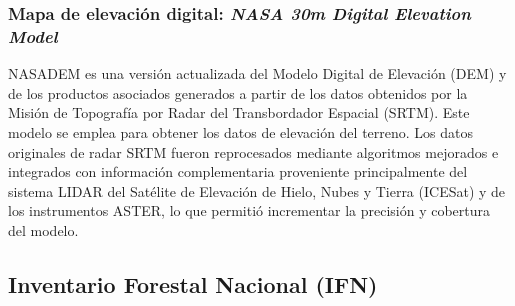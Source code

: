 \subsubsection*{Mapa de elevación digital: \textit{NASA 30m Digital Elevation Model}}

NASADEM \cite{nasadem_data} es una versión actualizada del Modelo Digital de Elevación (DEM) y de los productos asociados generados a partir de los datos obtenidos por la Misión de Topografía por Radar del Transbordador Espacial (SRTM). Este modelo se emplea para obtener los datos de elevación del terreno. Los datos originales de radar SRTM fueron reprocesados mediante algoritmos mejorados e integrados con información complementaria proveniente principalmente del sistema LIDAR del Satélite de Elevación de Hielo, Nubes y Tierra (ICESat) y de los instrumentos ASTER, lo que permitió incrementar la precisión y cobertura del modelo.

\begin{table}[H]
    \renewcommand{\arraystretch}{2.5} %
    
    \centering
    \caption{Columnas empleadas de los datasets de NASADEM}
    \label{tab:nasadem}
\end{table}

\subsection{Inventario Forestal Nacional (IFN)}\label{section:tablas_ifn}





